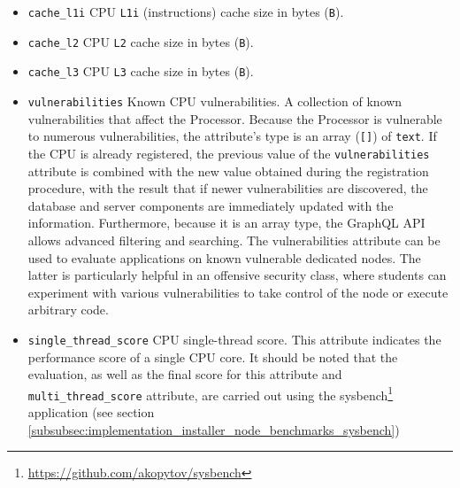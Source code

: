 \begin{itemize}
  \item \texttt{cache\_l1i}
    \newline
    CPU \texttt{L1i} (instructions) cache size in bytes (\texttt{B}).

  \item \texttt{cache\_l2}
    \newline
    CPU \texttt{L2} cache size in bytes (\texttt{B}).

  \item \texttt{cache\_l3}
    \newline
    CPU \texttt{L3} cache size in bytes (\texttt{B}).

  \item \texttt{vulnerabilities}
    \newline
    Known CPU vulnerabilities.
    \newline
    A collection of known vulnerabilities that affect the Processor.
    \newline
    Because the Processor is vulnerable to numerous vulnerabilities, the attribute's
    type is an array (\texttt{[]}) of \texttt{text}. If the CPU is already registered,
    the previous value of the \texttt{vulnerabilities} attribute is combined with
    the new value obtained during the registration procedure, with the result
    that if newer vulnerabilities are discovered, the database and server components
    are immediately updated with the information. Furthermore, because it is an array
    type, the GraphQL API allows advanced filtering and searching.
    \newline
    The vulnerabilities attribute can be used to evaluate applications on known vulnerable
    dedicated nodes. The latter is particularly helpful in an offensive security
    class, where students can experiment with various vulnerabilities to take control
    of the node or execute arbitrary code.

  \item \texttt{single\_thread\_score}
    \newline
    CPU single-thread score.
    \newline
    This attribute indicates the performance score of a single CPU core.
    \newline
    It should be noted that the evaluation, as well as the final score for this attribute
    and \texttt{multi\_thread\_score} attribute, are carried out using the sysbench\footnote{\url{https://github.com/akopytov/sysbench}}
    application (see section
    \ref{subsubsec:implementation_installer_node_benchmarks_sysbench})


\end{itemize}
